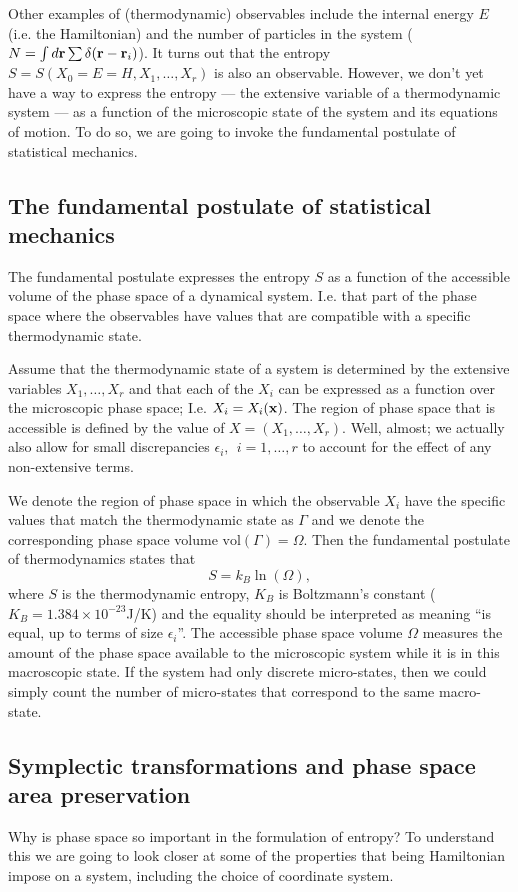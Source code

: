\documentclass{article}
\begin{document}
Other examples of (thermodynamic) observables include the internal energy $E$ (i.e. the Hamiltonian) and the number of particles in the system ($N = \int d{\bf r}\sum\delta({\bf r}-{\bf r}_i)$).
It turns out that the entropy $S=S(X_0=E=H,X_1,\ldots,X_r)$ is also an observable. However, we don't yet have a way to express the entropy --- the extensive variable of a thermodynamic system --- as a function of the microscopic state of the system and its equations of motion. To do so, we are going to invoke the fundamental postulate of statistical mechanics.

\subsection{The fundamental postulate of statistical mechanics}
The fundamental postulate expresses the entropy $S$ as a function of the accessible volume of the phase space of a dynamical system. I.e. that part of the phase space where the observables have values that are compatible with a specific thermodynamic state.

Assume that the thermodynamic state of a system is determined by the extensive variables $X_1,\ldots,X_r$ and that each of the $X_i$ can be expressed as a function over the microscopic phase space; I.e. $X_i = X_i({\bf x})$.
The region of phase space that is accessible is defined by the value of $X = (X_1,\ldots,X_r)$. Well, almost; we actually also allow for small discrepancies $\epsilon_i,~~i=1,\ldots,r$ to account for the effect of any non-extensive terms.

We denote the region of phase space in which the observable $X_i$ have the specific values that match the thermodynamic state as $\Gamma$ and we denote the corresponding phase space volume $\text{vol}(\Gamma)=\Omega$. Then the fundamental postulate of thermodynamics states that
\begin{equation}
	S = k_B\ln(\Omega),
	\label{eqS}
\end{equation}
where $S$ is the thermodynamic entropy, $K_B$ is Boltzmann's constant ($K_B = 1.384\times10^{-23}$J/K) and the equality should be interpreted as meaning ``is equal, up to terms of size $\epsilon_i$''. The accessible phase space volume $\Omega$ measures the amount of the phase space available to the microscopic system while it is in this macroscopic state. If the system had only discrete micro-states, then we could simply count the number of micro-states that correspond to the same macro-state. 


\subsection{Symplectic transformations and phase space area preservation}
Why is phase space so important in the formulation of entropy? To understand this we are going to look closer at some of the properties that being Hamiltonian impose on a system, including the choice of coordinate system.
\end{document}
